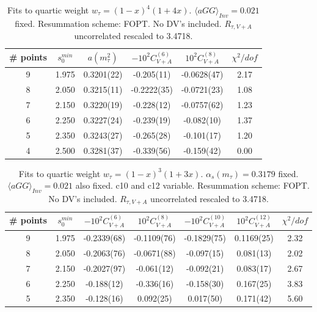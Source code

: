 \documentclass[12pt]{article}
\begin{document}
\begin{table}
  \centering
  \begin{tabular}{ | c c c c c c | }
    \hline
    \# points & $s_0^{min}$ & $a(m_\tau^2)$ & $-10^2 C_{V+A}^{(6)}$ & $10^2 C_{V+A}^{(8)}$ & $\chi^2/dof$ \\ 
    \hline
    9 & 1.975 & 0.3201(22) & -0.205(11)  & -0.0628(47) & 2.17 \\ 
    8 & 2.050 & 0.3215(11) & -0.2222(35) & -0.0721(23) & 1.08 \\
    7 & 2.150 & 0.3220(19) & -0.228(12)  & -0.0757(62) & 1.23 \\
    6 & 2.250 & 0.3227(24) & -0.239(19)  & -0.082(10)  & 1.37 \\
    5 & 2.350 & 0.3243(27) & -0.265(28)  & -0.101(17)  & 1.20 \\
    4 & 2.500 & 0.3281(37) & -0.339(56)  & -0.159(42)  & 0.00 \\
    \hline
  \end{tabular}
  \caption{Fits to quartic weight $w_{\tau} = (1 - x)^4 (1 + 4x)$.
    $\langle aGG \rangle_{Inv} = 0.021$ fixed. Resummation scheme: FOPT.
    No DV's included. $R_{\tau, V+A}$ uncorrelated rescaled to 3.4718.}
\end{table}

\begin{table}
  \centering
  \begin{tabular}{ | c c c c c c c | }
    \hline
    \# points & $s_0^{min}$ & $-10^2 C_{V+A}^{(6)}$ & $10^2 C_{V+A}^{(8)}$ &
    $-10^2 C_{V+A}^{(10)}$ & $10^2 C_{V+A}^{(12)}$ & $\chi^2/dof$
    \\ 
    \hline
    9 & 1.975 & -0.2339(68) & -0.1109(76) & -0.1829(75) & 0.1169(25) & 2.32 \\ 
    8 & 2.050 & -0.2063(76) & -0.0671(88) & -0.097(15)  & 0.081(13)  & 2.02 \\
    7 & 2.150 & -0.2027(97) & -0.061(12)  & -0.092(21)  & 0.083(17)  & 2.67 \\
    6 & 2.250 & -0.188(12)  & -0.336(16)  & -0.158(30)  & 0.167(25)  & 3.83 \\
    5 & 2.350 & -0.128(16)  & 0.092(25)   & 0.017(50)   & 0.171(42)  & 5.60 \\
    \hline
  \end{tabular}
  \caption{Fits to quartic weight $w_{\tau} = (1 - x)^3 (1 + 3x)$.
    $\alpha_s(m_\tau) = 0.3179$ fixed. $\langle aGG \rangle_{Inv} = 0.021$
    also fixed. c10 and c12 variable. Resummation scheme: FOPT.
    No DV's included. $R_{\tau, V+A}$ uncorrelated rescaled to 3.4718.}
\end{table}
\end{document}
